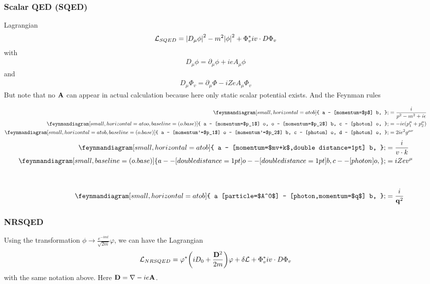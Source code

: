 \documentclass{article}
\newcommand{\lag}{\mathcal{L}}
\begin{document}
\subsubsection{Scalar QED (SQED)}
Lagrangian
\begin{align}
  \lag_{SQED}=\abs{D_{\mu}\phi}^2-m^2\abs{\phi}^2+\Phi_v^*iv\cdot D\Phi_v
  \label{SQEDLAG}
\end{align}
with
\begin{align*}
  D_{\mu}\phi=\partial_{\mu}\phi+ieA_{\mu}\phi
\end{align*}
and 
\begin{align*}
  D_{\mu}\Phi_v=\partial_{\mu}\Phi-iZeA_{\mu}\Phi_v
\end{align*}
But note that no $\vb{A}$ can appear in actual calculation because here only static scalar potential exists. 
And the Feynman rules
\clearpage
\begin{multicols}{2}
  \begin{align*}
	\feynmandiagram[small,horizontal=a to b]{
	a -- [momentum=$p$] b,
    };&=\frac{i}{p^2-m^2+i\epsilon}\\
	\feynmandiagram[small,horizontal=a to o,baseline=(o.base)]{
	  a -- [momentum=$p_1$] o,
	  o -- [momentum=$p_2$] b,
	  c -- [photon] o,
	};&=-ie(p_1^{\mu}+p_2^{\mu})\\
	\feynmandiagram[small,horizontal=a to b,baseline=(o.base)]{
	  a -- [momentum'=$p_1$] o -- [momentum'=$p_2$] b,
	  c -- [photon] o,
	  d -- [photon] o,
	};&=2ie^2g^{\mu\nu}
  \end{align*}
  \begin{align*}
	\feynmandiagram[small,horizontal=a to b]{
		a -- [momentum=$mv+k$,double distance=1pt] b,
	};&=\frac{i}{v\cdot k}\\
	\feynmandiagram[small,baseline=(o.base)]{
	  a -- [double distance=1pt] o -- [double distance=1pt] b,
	  c -- [photon] o,
	};&=iZev^{\mu}\\\\\\
	\feynmandiagram[small,horizontal=a to b]{
	  a [particle=$A^0$] -- [photon,momentum=$q$] b,
	};&=\frac{i}{\vb{q}^2}
  \end{align*}
\end{multicols}
\subsubsection{NRSQED}
Using the transformation $\displaystyle\phi\rightarrow\frac{e^{-imt}}{\sqrt{2m}}\varphi$, we can have the Lagrangian
\begin{align}
  \lag_{NRSQED}=\varphi^*\pqty{iD_0+\frac{\vb{D}^2}{2m}}\varphi+\delta\lag +\Phi_v^*iv\cdot D\Phi_v
  \label{NRSQEDLAG}
\end{align}
with the same notation above. Here $\vb{D}=\nabla-ie\vb{A}$.
\end{document}
